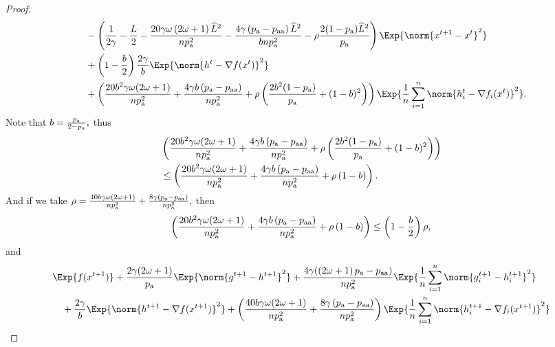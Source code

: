 \documentclass{article}
\newcommand*{\probavailable}{\ensuremath{p_{\textnormal{a}}}}
\newcommand*{\probpairaa}{\ensuremath{p_{\textnormal{aa}}}}
\begin{document}
\begin{proof}
\begin{align*}
      &\quad - \left(\frac{1}{2\gamma} - \frac{L}{2} - \frac{20 \gamma \omega \left(2 \omega + 1\right) \widehat{L}^2}{n \probavailable^2} - \frac{4\gamma\left(\probavailable - \probpairaa\right)\widehat{L}^2}{b n \probavailable^2} - \rho \frac{2(1 - \probavailable) \widehat{L}^2}{\probavailable} \right) \Exp{\norm{x^{t+1} - x^t}^2} \\
      &\quad + \left(1 - \frac{b}{2}\right)\frac{2\gamma}{b} \Exp{\norm{h^{t} - \nabla f(x^{t})}^2} \\
      &\quad + \left(\frac{20 b^2 \gamma \omega (2 \omega + 1)}{n \probavailable^2} + \frac{4 \gamma b \left(\probavailable - \probpairaa\right)}{n \probavailable^2} + \rho \left(\frac{2 b^2 (1 - \probavailable)}{\probavailable} + (1 - b)^2\right) \right)\Exp{\frac{1}{n}\sum_{i=1}^n\norm{h^{t}_i - \nabla f_i(x^{t})}^2}.
    \end{align*}
    Note that $b = \frac{\probavailable}{2 - \probavailable},$ thus
    \begin{align*}
      &\left(\frac{20 b^2 \gamma \omega (2 \omega + 1)}{n \probavailable^2} + \frac{4 \gamma b \left(\probavailable - \probpairaa\right)}{n \probavailable^2} + \rho \left(\frac{2 b^2 (1 - \probavailable)}{\probavailable} + (1 - b)^2\right) \right) \\
      &\leq \left(\frac{20 b^2 \gamma \omega (2 \omega + 1)}{n \probavailable^2} + \frac{4 \gamma b \left(\probavailable - \probpairaa\right)}{n \probavailable^2} + \rho \left(1 - b\right) \right).
    \end{align*}
    And if we take $\rho = \frac{40 b \gamma \omega (2 \omega + 1)}{n \probavailable^2} + \frac{8 \gamma \left(\probavailable - \probpairaa\right)}{n \probavailable^2},$ then
    \begin{align*}
      \left(\frac{20 b^2 \gamma \omega (2 \omega + 1)}{n \probavailable^2} + \frac{4 \gamma b \left(\probavailable - \probpairaa\right)}{n \probavailable^2} + \rho \left(1 - b\right) \right) \leq \left(1 - \frac{b}{2}\right)\rho,
    \end{align*}
    and 
    \begin{align*}
      &\Exp{f(x^{t + 1})} + \frac{2\gamma (2 \omega + 1)}{\probavailable} \Exp{\norm{g^{t+1} - h^{t+1}}^2} + \frac{4\gamma (\left(2 \omega + 1\right)\probavailable - \probpairaa)}{n \probavailable^2} \Exp{\frac{1}{n}\sum_{i=1}^n\norm{g^{t+1}_i - h^{t+1}_i}^2}\\
      &\quad  + \frac{2\gamma}{b} \Exp{\norm{h^{t+1} - \nabla f(x^{t+1})}^2} + \left(\frac{40 b \gamma \omega (2 \omega + 1)}{n \probavailable^2} + \frac{8 \gamma \left(\probavailable - \probpairaa\right)}{n \probavailable^2}\right) \Exp{\frac{1}{n}\sum_{i=1}^n\norm{h^{t+1}_i - \nabla f_i(x^{t+1})}^2}\\

\end{align*}
\end{proof}
\end{document}
